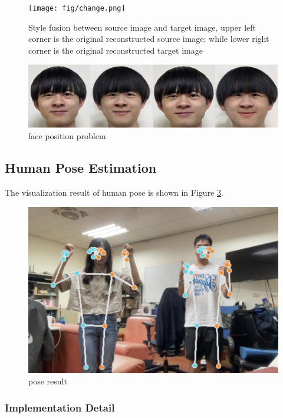 \begin{figure}[ht]
\centering
    \centering
    \texttt{[image: fig/change.png]}
    \caption{Style fusion between source image and target image, upper left corner is the original reconstructed source image; while lower right corner is the original reconstructed target image}
    \label{fig:stylechange}
\end{figure}

\begin{figure}[ht]
\centering
    \centering
    \includegraphics[scale=.3]{fig/cmp_pair.png}
    \caption{face position problem}
    \label{fig:face position problem}
\end{figure}

\subsection{Human Pose Estimation}

The visualization result of human pose is shown in Figure \ref{fig:pose result}.

\begin{figure}[h]
\centering
    \centering
    \includegraphics[scale=.15]{fig/pose_result.png}
    \caption{pose result}
    \label{fig:pose result}
\end{figure}
\subsubsection{Implementation Detail}



